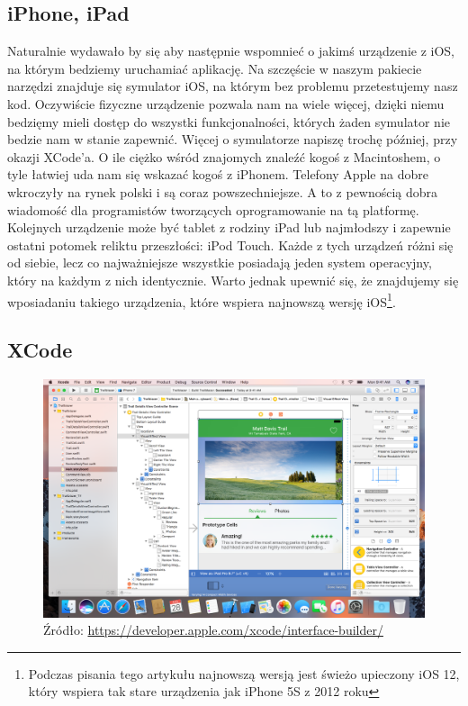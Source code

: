 \documentclass{article}
\begin{document}
\subsection*{iPhone, iPad}
Naturalnie wydawało by się aby następnie wspomnieć o jakimś urządzenie z iOS, na
którym bedziemy uruchamiać aplikację. Na szczęście w naszym pakiecie narzędzi 
znajduje się symulator iOS, na którym bez problemu przetestujemy nasz kod.
Oczywiście fizyczne urządzenie pozwala nam na wiele więcej, dzięki niemu bedzięmy
mieli dostęp do wszystki funkcjonalności, których żaden symulator nie bedzie nam 
w stanie zapewnić. Więcej o symulatorze napiszę trochę później, przy okazji XCode'a.
O ile ciężko wśród znajomych znaleźć kogoś z Macintoshem, o tyle łatwiej uda nam 
się wskazać kogoś z iPhonem. Telefony Apple na dobre wkroczyły na rynek polski i 
są coraz powszechniejsze. A to z pewnością dobra wiadomość dla programistów tworzących
oprogramowanie na tą platformę. Kolejnych urządzenie może być tablet z rodziny iPad
lub najmłodszy i zapewnie ostatni potomek reliktu przeszłości: iPod Touch. Każde
z tych urządzeń różni się od siebie, lecz co najważniejsze wszystkie posiadają 
jeden system operacyjny, który na każdym z nich identycznie. Warto jednak upewnić
się, że znajdujemy się wposiadaniu takiego urządzenia, które wspiera najnowszą
wersję iOS\footnote{Podczas pisania tego artykułu najnowszą wersją jest świeżo 
upieczony iOS 12, który wspiera tak stare urządzenia jak iPhone 5S z 2012 roku}.

\subsection*{XCode}

\begin{figure}[h]
\centering
\includegraphics[width=12cm]{interface-builder_2x}
\caption{Źródło: \url{https://developer.apple.com/xcode/interface-builder/}}
\end{figure}
\end{document}
